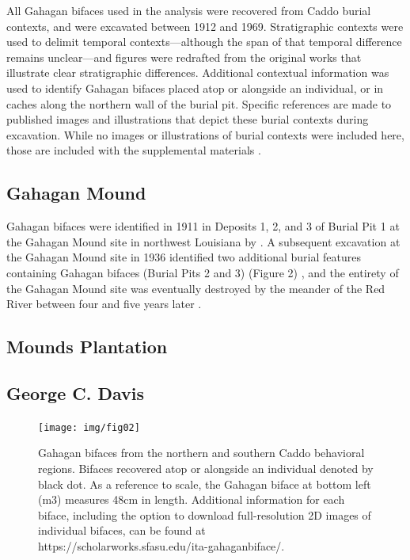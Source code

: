 \documentclass[]{interact}
\theoremstyle{plain}%
\theoremstyle{definition}
\theoremstyle{remark}
\begin{document}
All Gahagan bifaces used in the analysis were recovered from Caddo
burial contexts, and were excavated between 1912 and 1969. Stratigraphic
contexts were used to delimit temporal contexts---although the span of
that temporal difference remains unclear---and figures were redrafted
from the original works that illustrate clear stratigraphic differences.
Additional contextual information was used to identify Gahagan bifaces
placed atop or alongside an individual, or in caches along the northern
wall of the burial pit. Specific references are made to published images
and illustrations that depict these burial contexts during excavation.
While no images or illustrations of burial contexts were included here,
those are included with the supplemental materials \citep{RN11065}.

\hypertarget{gahagan-mound}{%
\subsection{Gahagan Mound}\label{gahagan-mound}}

Gahagan bifaces were identified in 1911 in Deposits 1, 2, and 3 of
Burial Pit 1 at the Gahagan Mound site in northwest Louisiana by
\citet[Figures 18-19, 21]{RN7115}. A subsequent excavation at the
Gahagan Mound site in 1936 identified two additional burial features
containing Gahagan bifaces (Burial Pits 2 and 3) (Figure 2)
\citep[Plate 27]{RN8176}, and the entirety of the Gahagan Mound site was
eventually destroyed by the meander of the Red River between four and
five years later \citep{RN10759}.

\hypertarget{mounds-plantation}{%
\subsection{Mounds Plantation}\label{mounds-plantation}}

\hypertarget{george-c.-davis}{%
\subsection{George C. Davis}\label{george-c.-davis}}

\begin{figure}

{\centering \texttt{[image: img/fig02]} 

}

\caption{Gahagan bifaces from the northern and southern Caddo behavioral regions. Bifaces recovered atop or alongside an individual denoted by black dot. As a reference to scale, the Gahagan biface at bottom left (m3) measures 48cm in length. Additional information for each biface, including the option to download full-resolution 2D images of individual bifaces, can be found at https://scholarworks.sfasu.edu/ita-gahaganbiface/.}\label{fig:gahagan bifaces 2D}
\end{figure}
\end{document}
